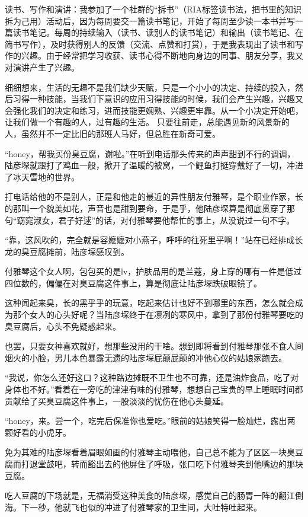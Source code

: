 \documentclass[11pt,a4paper]{article}
\begin{document}
读书、写作和演讲：我参加了一个社群的“拆书”（RIA标签读书法，把书里的知识拆为己用）活动后，因为每周要交一篇读书笔记，开始了每周至少读一本书并写一篇读书笔记。每周的持续输入（读书、读别人的读书笔记）和输出（读书笔记、在简书写作），及时获得别人的反馈（交流、点赞和打赏），于是我表现出了读书和写作的兴趣。由于经常把学习收获、读书心得不断地向身边的同事、朋友分享，我又对演讲产生了兴趣。﻿﻿﻿﻿﻿﻿﻿﻿﻿

细细想来，生活的无趣不是我们缺少天赋，只是一个小小的决定、持续的投入，然后习得一种技能，当我们下意识的应用习得技能的时候，我们会产生兴趣，兴趣又会强化我们的决定和练习，进而技能更娴熟、兴趣更牢靠。从一个小决定开始吧，让我们做一个有趣的人，过有趣的生活。
只要往前走，总能遇见新的风景新的人，虽然并不一定比旧的那班人马好，但总胜在新奇可爱。﻿﻿

“honey，帮我买份臭豆腐，谢啦。”在听到电话那头传来的声声甜到不行的调调，陆彦堔就跟打了鸡血一般，掀开了温暖的被窝，一个鲤鱼打挺穿戴好了一切，冲进了冰天雪地的世界。﻿﻿

打电话给他的不是别人，正是和他走的最近的异性朋友付雅琴，是个职业作家，长的那叫一个貌美如花，声音也是甜到要命，于是乎，他陆彦堔算是彻底贯穿了那句“窈窕淑女，君子好逑”的话，对付雅琴要他帮忙的事上，从没说过一句不字。﻿﻿

“靠，这风吹的，完全就是容嬷嬷对小燕子，呼呼的往死里乎啊！”站在已经排成长龙的臭豆腐摊前，陆彦堔感叹到。﻿﻿

付雅琴这个女人啊，包包买的是lv，护肤品用的是兰蔻，身上穿的哪有一件是低过四位数的，偏偏在对臭豆腐这件事上，算是彻底让陆彦堔跌破眼镜了。﻿﻿

这种闻起来臭，长的黑乎乎的玩意，吃起来估计也好不到哪里的东西，怎么就会成为那个女人的心头好呢？当陆彦堔终于在凛冽的寒风中，拿到了那份付雅琴要吃的臭豆腐后，心头不免疑惑起来。﻿﻿

也罢，只要女神喜欢就好，想那些没用的干啥。想到即将看到付雅琴那张不食人间烟火的小脸，男儿本色暴露无遗的陆彦堔屁颠屁颠的冲他心仪的姑娘家跑去。﻿﻿﻿

“我说，你怎么还好这口？这种路边摊既不卫生也不可靠，还是油炸食品，吃了对身体也不好。”看着在一旁吃的津津有味的付雅琴，想想自己宝贵的早上睡眠时间都贡献给了买臭豆腐这件事上，一股淡淡的忧伤在他心头蔓延。﻿﻿

“honey，来。尝一个，吃完后保准你也爱吃。”眼前的姑娘笑得一脸灿烂，露出两颗好看的小虎牙。﻿﻿

免为其难的陆彦堔看着眉眼如画的付雅琴主动喂他，自己总不能为了区区一块臭豆腐而打退堂鼓吧，转而豁出去的他屏住了呼吸，张口吃下付雅琴夹到他嘴边的那块豆腐。﻿﻿

吃人豆腐的下场就是，无福消受这种美食的陆彦堔，感觉自己的肠胃一阵的翻江倒海。下一秒，他就飞也似的冲进了付雅琴家的卫生间，大吐特吐起来。﻿﻿
\end{document}
